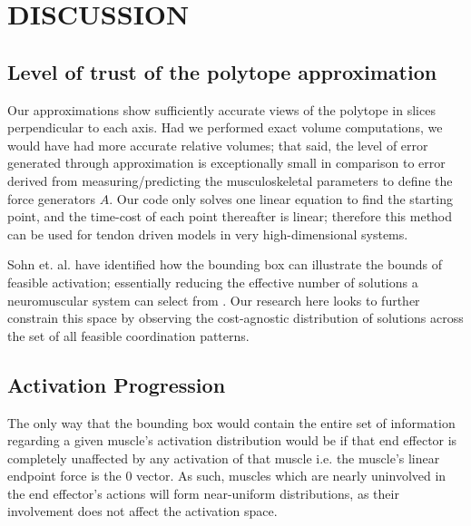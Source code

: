 \section{DISCUSSION}

\subsection{Level of trust of the polytope approximation} %
\label{sub:level_of_trust_of_the_polytope_approximation}

Our approximations show sufficiently accurate views of the polytope in slices perpendicular to each axis. Had we performed exact volume computations, we would have had more accurate relative volumes; that said, the level of error generated through approximation is exceptionally small in comparison to error derived from measuring/predicting the musculoskeletal parameters to define the force generators $A$. Our code only solves one linear equation to find the starting point, and the time-cost of each point thereafter is linear; therefore this method can be used for tendon driven models in very high-dimensional systems.

Sohn et. al. have identified how the bounding box can illustrate the bounds of feasible activation; essentially reducing the effective number of solutions a neuromuscular system can select from \cite{sohn2013cat_bounding_box}. Our research here looks to further constrain this space by observing the cost-agnostic distribution of solutions across the set of all feasible coordination patterns.

\subsection{Activation Progression} %
\label{sub:activation_progression}
The only way that the bounding box would contain the entire set of information regarding a given muscle's activation distribution would be if that end effector is completely unaffected by any activation of that muscle i.e. the muscle's linear endpoint force is the 0 vector. As such, muscles which are nearly uninvolved in the end effector's actions will form near-uniform distributions, as their involvement does not affect the activation space.



